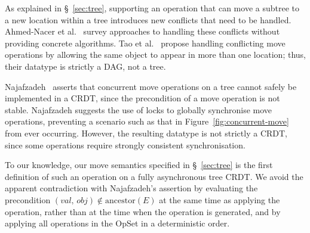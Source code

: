 As explained in \S~\ref{sec:tree}, supporting an operation that can move a subtree to a new location within a tree introduces new conflicts that need to be handled.
Ahmed-Nacer et al.~\cite{AhmedNacer:2012us} survey approaches to handling these conflicts without providing concrete algorithms.
Tao et al.~\cite{Tao:2015gd} propose handling conflicting move operations by allowing the same object to appear in more than one location; thus, their datatype is strictly a DAG, not a tree.

Najafzadeh~\cite{Najafzadeh:2017vk,Najafzadeh:2018bw} asserts that concurrent move operations on a tree cannot safely be implemented in a CRDT, since the precondition of a move operation is not stable.
Najafzadeh suggests the use of locks to globally synchronise move operations, preventing a scenario such as that in Figure~\ref{fig:concurrent-move} from ever occurring.
However, the resulting datatype is not strictly a CRDT, since some operations require strongly consistent synchronisation.

To our knowledge, our move semantics specified in \S~\ref{sec:tree} is the first definition of such an operation on a fully asynchronous tree CRDT.
We avoid the apparent contradiction with Najafzadeh's assertion by evaluating the precondition $(\mathit{val},\, \mathit{obj}) \notin \mathrm{ancestor}(E)$ at the same time as applying the operation, rather than at the time when the operation is generated, and by applying all operations in the OpSet in a deterministic order.
